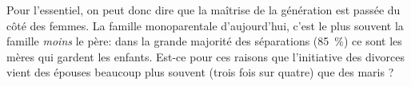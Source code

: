  Pour l'essentiel, on peut donc dire que la maîtrise de la génération est passée du côté des femmes. La famille monoparentale d'aujourd'hui, c'est le plus souvent la famille \emph{moins} le père: dans la grande majorité des séparations (85~\%) ce sont les mères qui gardent les enfants. Est-ce pour ces raisons que l'initiative des divorces vient des épouses beaucoup plus souvent (trois fois sur quatre) que des maris  ? 


 
 
 



 


